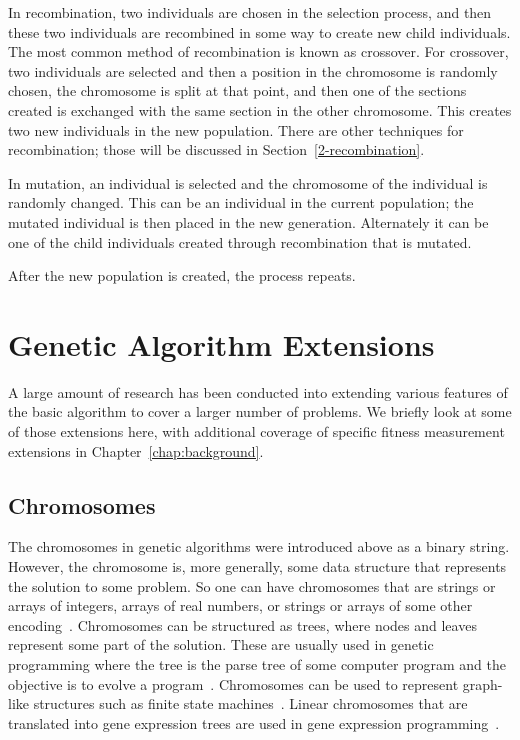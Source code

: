 In recombination, two individuals are chosen in the selection process, and then
these two individuals are recombined in some way to create new child
individuals. The most common method of recombination is known as crossover. For
crossover, two individuals are selected and then a position in the chromosome is
randomly chosen, the chromosome is split at that point, and then one of the
sections created is exchanged with the same section in the other chromosome.
This creates two new individuals in the new population. There are other
techniques for recombination; those will be discussed in
Section~\ref{2-recombination}.

In mutation, an individual is selected and the chromosome of the individual is
randomly changed. This can be an individual in the current population; the
mutated individual is then placed in the new generation. Alternately it can be
one of the child individuals created through recombination that is mutated.

After the new population is created, the process repeats.

\section{Genetic Algorithm Extensions}

A large amount of research has been conducted into extending various features of
the basic algorithm to cover a larger number of problems. We briefly look at
some of those extensions here, with additional coverage of specific fitness
measurement extensions in Chapter~\ref{chap:background}.

\subsection{Chromosomes}

The chromosomes in genetic algorithms were introduced above as a binary string.
However, the chromosome is, more generally, some data structure that represents
the solution to some problem. So one can have chromosomes that are strings or
arrays of integers, arrays of real numbers, or strings or arrays of some other
encoding~\cite{haupt2004practical}. Chromosomes can be structured as trees,
where nodes and leaves represent some part of the solution. These are usually
used in genetic programming where the tree is the parse tree of some computer
program and the objective is to evolve a program~\cite{koza1992genetic}.
Chromosomes can be used to represent graph-like structures such as finite state
machines~\cite{fogel1999intelligence,fogel2000evolutionary}. Linear chromosomes
that are translated into gene expression trees are used in gene expression
programming~\cite{ferreira2012gene}.

